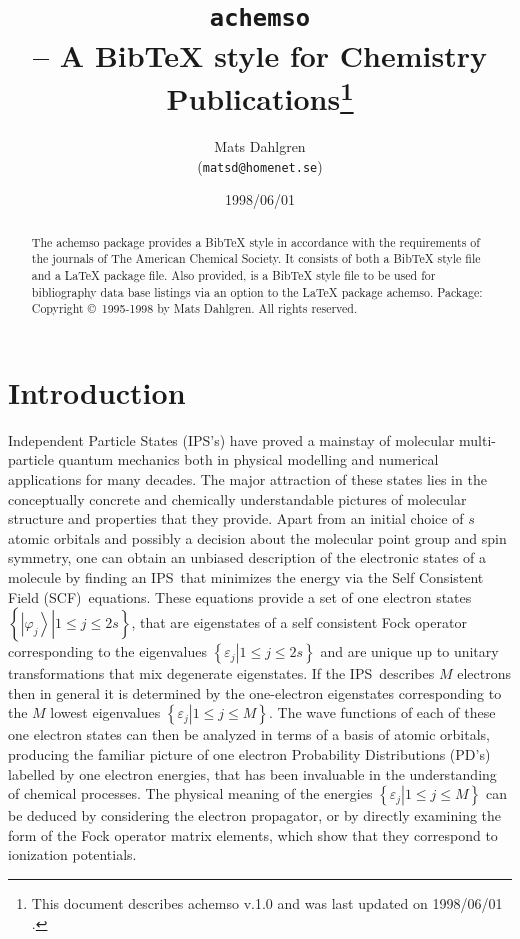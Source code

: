 \documentclass{preprint}
\begin{document}
\title{\texttt{achemso}\\
-- A BibTeX style for Chemistry Publications\thanks{%
This document describes \textsf{achemso} v.1.0{} and was last updated on
1998/06/01 .}}
\author{Mats Dahlgren \\
(\texttt{matsd@homenet.se})}
\date{1998/06/01}
\maketitle

\begin{abstract}
The \textsf{achemso} package provides a BibTeX style in accordance with the
requirements of the journals of The American Chemical Society. It consists
of both a BibTeX style file and a LaTeX package file. Also provided, is a
BibTeX style file to be used for bibliography data base listings via an
option to the LaTeX package \textsf{achemso}. \newline
Package: Copyright \copyright\ 1995-1998 by Mats Dahlgren. All rights
reserved.
\end{abstract}

\section{Introduction \label{intro}}

Independent Particle States (IPS's) have proved a mainstay of molecular
multi-particle quantum mechanics both in physical modelling and numerical
applications for many decades. The major attraction of these states lies in
the conceptually concrete and chemically understandable pictures of
molecular structure and properties that they provide. Apart from an initial
choice of $s$ atomic orbitals and possibly a decision about the molecular
point group and spin symmetry, one can obtain an unbiased description of the
electronic states of a molecule by finding an IPS\ that minimizes the energy
via the Self Consistent Field (SCF)\ equations. These equations provide a
set of one electron states $\left\{ \left. \left\vert
\varphi_{j}\right\rangle \right\vert 1\leq j\leq2s\right\} $, that are
eigenstates of a self consistent Fock operator corresponding to the
eigenvalues $\left\{ \left. \varepsilon_{j}\right\vert 1\leq j\leq2s\right\}
$ and are unique up to unitary transformations that mix degenerate
eigenstates. If the IPS\ describes $M$ electrons then in general it is
determined by the one-electron eigenstates corresponding to the $M$ lowest
eigenvalues $\left\{ \left. \varepsilon _{j}\right\vert 1\leq j\leq
M\right\} $. The wave functions of each of these one electron states can
then be analyzed in terms of a basis of atomic orbitals, producing the
familiar picture of one electron Probability Distributions (PD's) labelled
by one electron energies, that has been invaluable in the understanding of
chemical processes. The physical meaning of the energies $\left\{ \left.
\varepsilon_{j}\right\vert 1\leq j\leq M\right\} $ can be deduced by
considering the electron propagator, or by directly examining the form of
the Fock operator matrix elements, which show that they correspond to
ionization potentials.
\end{document}
